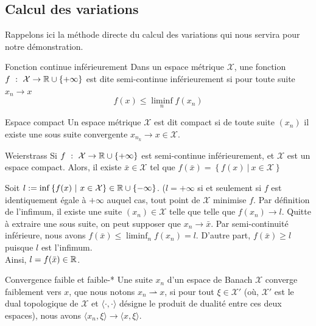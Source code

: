 \documentclass[a4paper,12pt]{article}
\begin{document}
\newpage
\nocite{*}


\newpage






\begin{appendices}
\section{Calcul des variations}
\label{sec:variations}
Rappelons ici la méthode directe du calcul des variations qui nous servira pour notre démonstration.
 
\begin{definition}{Fonction continue inférieurement}
Dans un espace métrique $\mathcal{X}$, une fonction $f\ :\ \mathcal{X}\rightarrow \RR \cup \{+\infty\}$ est dite semi-continue inférieurement si pour toute suite $x_n\rightarrow x$
$$
f(x) \leq \liminf_n f(x_n)
$$
\end{definition}
\begin{definition}{Espace compact}
Un espace métrique $\mathcal{X}$ est dit compact si de toute suite $(x_n)$ il existe une sous suite convergente $x_{n_k} \rightarrow x\in\mathcal{X}$. 
\end{definition}

\begin{theoreme}{Weierstrass}
\label{thm:weierstrass}
Si $f\ :\ \mathcal{X}\rightarrow \RR \cup \{+\infty\}$ est semi-continue inférieurement, et $\mathcal{X}$ est un espace compact. Alors, il existe $\bar{x}\in\mathcal{X}$ tel que $f(\bar{x}) = \left\{f(x)\ |\ x\in\mathcal{X}\right\}$
\end{theoreme}
\begin{preuve}
Soit $l := \inf\left\{f(x)\ |\ x\in\mathcal{X}\right\}\in\RR\cup\{-\infty\}$. ($l=+\infty$ si et seulement si $f$ est identiquement égale à $+\infty$ auquel cas, tout point de $\mathcal{X}$ minimise $f$. Par définition de l'infimum, il existe une suite $(x_n)\in\mathcal{X}$ telle que telle que $f(x_n) \rightarrow l$. Quitte à extraire une sous suite, on peut supposer que $x_n\rightarrow \bar{x}$.
Par semi-continuité inférieure, nous avons $f(\bar{x}) \leq\liminf_n f(x_n)= l$. D'autre part, $f(\bar{x}) \geq l$ puisque $l$ est l'infimum. \\
Ainsi, $l=f(\bar{x})\in\mathbb{R}$.
\end{preuve}
\begin{definition}{Convergence faible et faible-*}
Une suite $x_n$ d'un espace de Banach $\mathcal{X}$ converge faiblement vers $x$, que nous notons $x_n \rightharpoonup x$, si pour tout $\xi\in\mathcal{X}'$ (où, $\mathcal{X}'$ est le dual topologique de $\mathcal{X}$ et $\langle \cdot,\cdot \rangle$ désigne le produit de dualité entre ces deux espaces), nous avons $\langle x_n,\xi\rangle \rightarrow \langle x,\xi\rangle$. \\


\end{definition}
\end{appendices}
\end{document}
